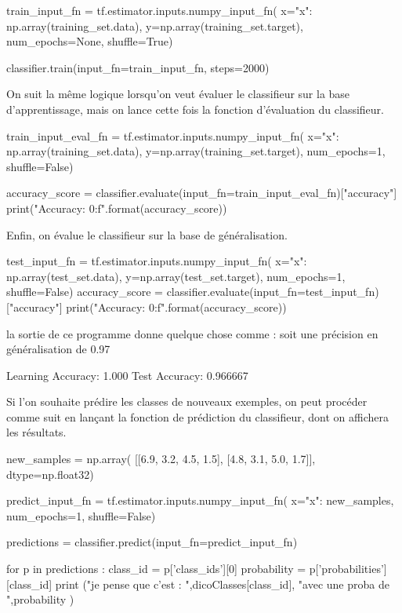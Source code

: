 \documentclass[a4paper,11pt]{book}
\begin{document}
\begin{mypython}
train_input_fn = tf.estimator.inputs.numpy_input_fn(
      x={"x": np.array(training_set.data)},
      y=np.array(training_set.target),
      num_epochs=None,
      shuffle=True)

classifier.train(input_fn=train_input_fn, steps=2000)
\end{mypython}

On suit la même logique lorsqu'on veut évaluer le classifieur sur la base d'apprentissage, mais on lance cette fois la fonction d'évaluation du classifieur.
\begin{mypython}
train_input_eval_fn = tf.estimator.inputs.numpy_input_fn(
      x={"x": np.array(training_set.data)},
      y=np.array(training_set.target),
      num_epochs=1,
      shuffle=False)

  
accuracy_score = classifier.evaluate(input_fn=train_input_eval_fn)["accuracy"]
print("\nLearning Accuracy: {0:f}\n".format(accuracy_score))
\end{mypython}

Enfin, on évalue le classifieur sur la base de généralisation.
\begin{mypython}
test_input_fn = tf.estimator.inputs.numpy_input_fn(
      x={"x": np.array(test_set.data)},
      y=np.array(test_set.target),
      num_epochs=1,
      shuffle=False)
accuracy_score = classifier.evaluate(input_fn=test_input_fn)["accuracy"]
print("\nTest Accuracy: {0:f}\n".format(accuracy_score))
\end{mypython}

 
la sortie de ce programme donne quelque chose comme : soit une précision en généralisation de 0.97%
\begin{myoutput}
Learning Accuracy: 1.000
Test Accuracy: 0.966667
\end{myoutput}


Si l'on souhaite prédire les classes de nouveaux exemples, on peut procéder comme suit en lançant la fonction de prédiction du classifieur, dont on affichera les résultats.

\begin{mypython}
new_samples = np.array(
      [[6.9, 3.2, 4.5, 1.5],
       [4.8, 3.1, 5.0, 1.7]], dtype=np.float32)

predict_input_fn = tf.estimator.inputs.numpy_input_fn(
      x={"x": new_samples},
      num_epochs=1,
      shuffle=False)

predictions = classifier.predict(input_fn=predict_input_fn)
  
for p in predictions :
    class_id = p['class_ids'][0]
    probability = p['probabilities'][class_id]
    print ("je pense que c'est : ",dicoClasses[class_id], "avec une proba de ",probability )

\end{mypython}
\end{document}
